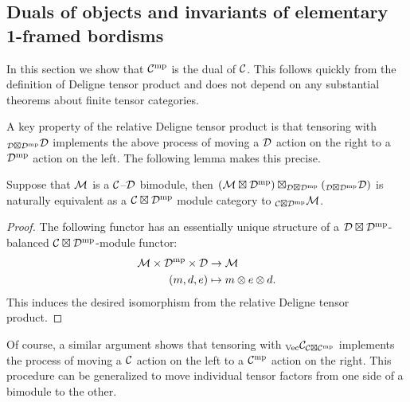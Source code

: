 \documentclass{amsart}
\begin{document}
\subsection{Duals of objects and invariants of elementary 1-framed bordisms} \label{sec:df-objects}

In this section we show that $\mathcal C^{\mathrm{mp}}$ is the dual of $\mathcal C$.  This follows quickly from the definition of Deligne tensor product and does not depend on any substantial theorems about finite tensor categories.

A key property of the relative Deligne tensor product is that tensoring with ${}_{\mathcal D \boxtimes \mathcal D^{\mathrm{mp}}} \mathcal D$ implements the above process of moving a $\mathcal D$ action on the right to a $\mathcal D^{\mathrm{mp}}$ action on the left.  The following lemma makes this precise.

\begin{lemma} \label{lemma-actionswitch}
Suppose that $\mathcal M$ is a $\mathcal C$--$\mathcal D$ bimodule, then $(\mathcal M \boxtimes \mathcal D^{\mathrm{mp}}) \boxtimes_{\mathcal D \boxtimes \mathcal D^{\mathrm{mp}}} ({}_{\mathcal D \boxtimes \mathcal D^{\mathrm{mp}}} \mathcal D)$ is naturally equivalent as a $\mathcal C \boxtimes \mathcal D^{\mathrm{mp}}$ module category to ${}_{\mathcal C \boxtimes \mathcal D^{\mathrm{mp}}}\mathcal M$.
\end{lemma}
\begin{proof}
The following functor has an essentially unique structure of a $\mathcal D \boxtimes \mathcal D^{\mathrm{mp}}$-balanced $\mathcal C \boxtimes \mathcal D^{\mathrm{mp}}$-module functor:
\begin{align*}
	\mathcal M \times \mathcal D^{\mathrm{mp}} \times \mathcal D & \to \mathcal M \\
	(m, d, e) & \mapsto m \otimes e \otimes d.
\end{align*}
This induces the desired isomorphism from the relative Deligne tensor product. 
\end{proof} %

\nid Of course, a similar argument shows that tensoring with ${}_{\mathrm{Vec}} \mathcal C_{\mathcal C \boxtimes \mathcal C^{\mathrm{mp}}}$ implements the process of moving a $\mathcal C$ action on the left to a $\mathcal C^{\mathrm{mp}}$ action on the right. 
This procedure can be generalized to move individual tensor factors from one side of a bimodule to the other.
\end{document}
